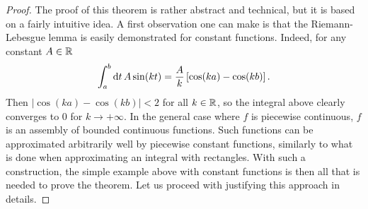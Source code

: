 \begin{proof}
  The proof of this theorem is rather abstract and technical, but it is based on a fairly
  intuitive idea. A first observation one can make is that the Riemann-Lebesgue lemma is
  easily demonstrated for constant functions. Indeed, for any constant $A\in\mathbb{R}$
  \begin{equation}
    \int_a^b\mathrm{d} t\,A\sin(kt)=\frac{A}{k}\,[\cos(ka)-\cos(kb)]\,.
    \label{eq:rl-const}
  \end{equation}
  Then $|\cos(ka)-\cos(kb)|<2$ for all $k\in\mathbb{R}$, so the integral above clearly converges
  to $0$ for $k\to+\infty$. In the general case where $f$ is piecewise continuous, $f$ is
  an assembly of bounded continuous functions. Such functions can be approximated
  arbitrarily well by piecewise constant functions, similarly to what is done when
  approximating an integral with rectangles. With such a construction, the simple example
  above with constant functions is then all that is needed to prove the theorem. Let us
  proceed with justifying this approach in details.


\end{proof}
